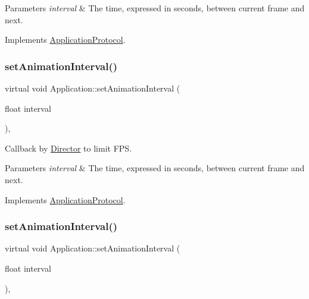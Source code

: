 \begin{DoxyParams}{Parameters}
{\em interval} & The time, expressed in seconds, between current frame and next. \\
\hline
\end{DoxyParams}


Implements \hyperlink{classApplicationProtocol_ac69ac0f01aaba7cc8654ec7cce4eb88f}{Application\+Protocol}.

\mbox{\label{classApplication_af04c472d3fac0d922d088896504925ac}} 
\subsubsection{\texorpdfstring{set\+Animation\+Interval()}{setAnimationInterval()}\hspace{0.1cm}{\footnotesize\ttfamily [2/12]}}
{\footnotesize\ttfamily virtual void Application\+::set\+Animation\+Interval (\begin{DoxyParamCaption}\item[{float}]{interval }\end{DoxyParamCaption})\hspace{0.3cm}{\ttfamily [override]}, {\ttfamily [virtual]}}



Callback by \hyperlink{classDirector}{Director} to limit F\+PS. 


\begin{DoxyParams}{Parameters}
{\em interval} & The time, expressed in seconds, between current frame and next. \\
\hline
\end{DoxyParams}


Implements \hyperlink{classApplicationProtocol_ac69ac0f01aaba7cc8654ec7cce4eb88f}{Application\+Protocol}.

\mbox{\label{classApplication_af04c472d3fac0d922d088896504925ac}} 
\subsubsection{\texorpdfstring{set\+Animation\+Interval()}{setAnimationInterval()}\hspace{0.1cm}{\footnotesize\ttfamily [3/12]}}
{\footnotesize\ttfamily virtual void Application\+::set\+Animation\+Interval (\begin{DoxyParamCaption}\item[{float}]{interval }\end{DoxyParamCaption})\hspace{0.3cm}{\ttfamily [override]}, {\ttfamily [virtual]}}



